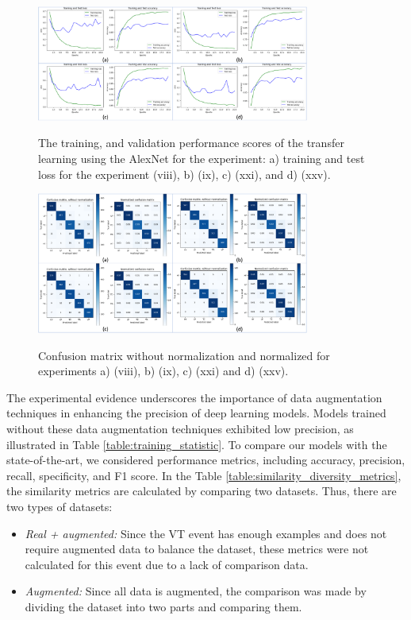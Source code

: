 \documentclass[journal]{IEEEtran}
\begin{document}
\begin{figure}
\centering
{\includegraphics[width=0.8\textwidth,keepaspectratio]{img/curvas_entrenamiento.png}}
\caption{The training, and validation performance scores of the transfer learning using the AlexNet for the experiment: a) training and test loss for the experiment (viii), b) (ix), c) (xxi), and d) (xxv).}
\label{fig:da_training}
\end{figure}
\begin{figure}
\centering
{\includegraphics[width=0.8\textwidth,keepaspectratio]{img/matriz_confusion.png}}
\caption{Confusion matrix without normalization and normalized for experiments a) (viii), b) (ix), c) (xxi) and d) (xxv).}
\label{fig:da_confusion_matrix}
\end{figure}

The experimental evidence underscores the importance of data augmentation techniques in enhancing the precision of deep learning models. Models trained without these data augmentation techniques exhibited low precision, as illustrated in Table \ref{table:training_statistic}.
To compare our models with the state-of-the-art, we considered performance metrics, including accuracy, precision, recall, specificity, and F1 score.
In the Table \ref{table:similarity_diversity_metrics}, the similarity metrics are calculated by comparing two datasets. Thus, there are two types of datasets:
\begin{itemize}
\item \textit{Real + augmented:} Since the VT event has enough examples and does not require augmented data to balance the dataset, these metrics were not calculated for this event due to a lack of comparison data.
\item \textit{Augmented:} Since all data is augmented, the comparison was made by dividing the dataset into two parts and comparing them.
\end{itemize}
\end{document}
